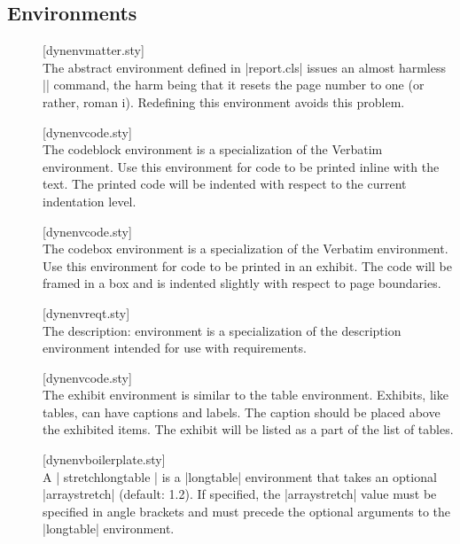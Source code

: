 \subsection{Environments}
\begin{description}
\item[] \hfill [dynenvmatter.sty] \\
  The abstract environment defined in |report.cls| issues an almost
  harmless |\titlepage| command,  the harm being that it resets the page
  number to one (or rather, roman i). Redefining this environment avoids
  this problem.
\item[] \hfill [dynenvcode.sty] \\
  The codeblock environment is a specialization of the Verbatim environment.
  Use this environment for code to be printed inline with the text. The
  printed code will be indented with respect to the current indentation level.
\item[] \hfill [dynenvcode.sty] \\
  The codebox environment is a specialization of the Verbatim environment.
  Use this environment for code to be printed in an exhibit. The code will
  be framed in a box and is indented slightly with respect to page boundaries.
\item[] \hfill [dynenvreqt.sty] \\
  The description: environment is a specialization of the description
  environment intended for use with requirements.
\item[] \hfill [dynenvcode.sty] \\
  The exhibit environment is similar to the table environment.
  Exhibits, like tables, can have captions and labels. The caption should
  be placed above the exhibited items. The exhibit will be listed as a part
  of the list of tables.
\item[] \hfill [dynenvboilerplate.sty] \\
  A | stretchlongtable | is a |longtable| environment that takes an optional
  |arraystretch| (default: 1.2). If specified, the |arraystretch| value must be
  specified in angle brackets and must precede the optional arguments to the
  |longtable| environment.
\end{description}
